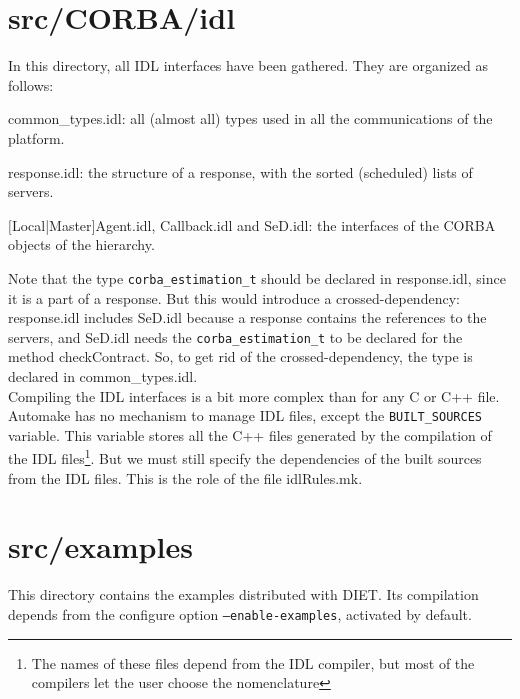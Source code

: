 


\section{\textsf{src/CORBA/idl}}
\label{s:IDL}

In this directory, all IDL interfaces have been gathered. They are organized as
follows:
\begin{description}
\item{\sf common\_types.idl}: all (almost all) types used in all the
  communications of the platform.
\item{\sf response.idl}: the structure of a response, with the sorted
  (scheduled) lists of servers.
\item{$[$\textsf{Local|Master}$]$\textsf{Agent.idl}, \textsf{Callback.idl} and
    \textsf{SeD.idl}}: the interfaces of the CORBA objects of the hierarchy.
\end{description}
Note that the type \texttt{corba\_estimation\_t} should be declared in
\textsf{response.idl}, since it is a part of a response. But this would
introduce a crossed-dependency: \textsf{response.idl} includes \textsf{SeD.idl}
because a response contains the references to the servers, and \textsf{SeD.idl}
needs the \texttt{corba\_estimation\_t} to be declared for the method
\textsf{checkContract}. So, to get rid of the crossed-dependency, the type is
declared in \textsf{common\_types.idl}.
\\

Compiling the IDL interfaces is a bit more complex than for any C or C++ file.
Automake has no mechanism to manage IDL files, except the
\texttt{BUILT\_SOURCES} variable. This variable stores all the C++ files
generated by the compilation of the IDL files\footnote{The names of these files
  depend from the IDL compiler, but most of the compilers let the user choose
  the nomenclature}. But we must still specify the dependencies of the built
sources from the IDL files. This is the role of the file \textsf{idlRules.mk}.



\section{\textsf{src/examples}}
\label{s:examples}

This directory contains the examples distributed with DIET. Its compilation
depends from the configure option \texttt{--enable-examples}, activated by
default.

